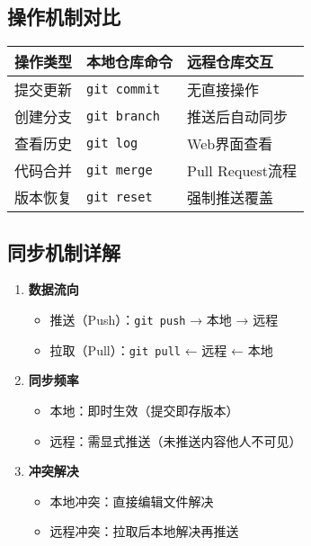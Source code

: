 \subsection{操作机制对比}
\begin{center}
\begin{tabular}{lll}
    \toprule
    \textbf{操作类型} & \textbf{本地仓库命令} & \textbf{远程仓库交互} \\
    \midrule
    提交更新 & \texttt{git commit} & 无直接操作 \\
    创建分支 & \texttt{git branch} & 推送后自动同步 \\
    查看历史 & \texttt{git log} & Web界面查看 \\
    代码合并 & \texttt{git merge} & Pull Request流程 \\
    版本恢复 & \texttt{git reset} & 强制推送覆盖 \\
    \bottomrule
\end{tabular}
\end{center}

\subsection{同步机制详解}
\begin{enumerate}[leftmargin=*, nosep]
    \item \textbf{数据流向}
    \begin{itemize}[leftmargin=*, nosep]
        \item 推送（Push）：\texttt{git push} → 本地 → 远程
        \item 拉取（Pull）：\texttt{git pull} ← 远程 ← 本地
    \end{itemize}
    
    \item \textbf{同步频率}
    
\begin{itemize}[leftmargin=*, nosep]
        \item 本地：即时生效（提交即存版本）
        \item 远程：需显式推送（未推送内容他人不可见）
    \end{itemize}
    
    \item \textbf{冲突解决}
    
\begin{itemize}[leftmargin=*, nosep]
        \item 本地冲突：直接编辑文件解决
        \item 远程冲突：拉取后本地解决再推送
    \end{itemize}
\end{enumerate}

